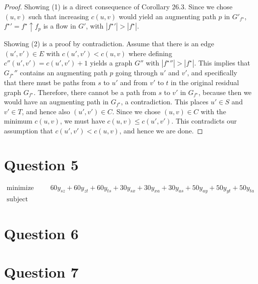 \documentclass[a4paper, 10pt, oneside, article]{memoir}
\begin{document}
\begin{proof}
  Showing (1) is a direct consequence of Corollary 26.3. Since we
  chose $(u,v)$ such that increasing $c(u,v)$ would yield an
  augmenting path $p$ in $G'_{f^\star}$, ${f^\star}' = f^\star
  \uparrow f_p$ is a flow in $G'$, with $|{f^\star}'| > |f^\star|$.

  Showing (2) is a proof by contradiction. Assume that there is an
  edge $(u', v') \in E$ with $c(u',v') < c(u,v)$ where defining
  $c''(u', v') = c(u',v')+1$ yields a graph $G''$ with $|{f^\star}''|
  > |f^\star|$. This implies that $G_{f^\star}''$ contains an
  augmenting path $p$ going through $u'$ and $v'$, and specifically
  that there must be paths from $s$ to $u'$ and from $v'$ to $t$ in
  the original residual graph $G_{f^\star}$. Therefore, there cannot
  be a path from $s$ to $v'$ in $G_{f^\star}$, because then we would
  have an augmenting path in $G_{f^\star}$, a contradiction. This
  places $u' \in S$ and $v' \in T$, and hence also $(u', v') \in
  C$. Since we chose $(u,v) \in C$ with the minimum $c(u,v)$, we must
  have $c(u,v) \leq c(u', v')$. This contradicts our assumption that
  $c(u', v') < c(u,v)$, and hence we are done.
\end{proof}

\section*{Question 5}

\begin{align*}
  \text{minimize}   &&& 60y_{sz} + 60y_{zt} + 60y_{ts} + 30y_{sx} + 30y_{xa} + 30y_{as} + 50y_{ay} + 50y_{yt} + 50y_{ta} \\
  \text{subject to} &&& 
\end{align*}

\section*{Question 6}


\section*{Question 7}



\end{document}
